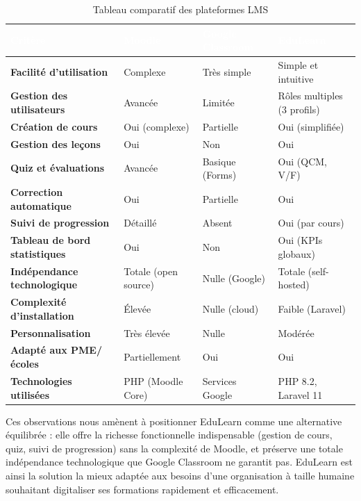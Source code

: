 \documentclass[12pt,a4paper]{report}
\begin{document}
\begin{table}[H]
\centering
\caption{Tableau comparatif des plateformes LMS}
\label{tab:comparaison_lms}
\renewcommand{\arraystretch}{1.6}
\begin{tabular}{|p{4.2cm}|>{\centering\arraybackslash}p{3cm}|>{\centering\arraybackslash}p{3cm}|>{\centering\arraybackslash}p{3cm}|}
\hline
\rowcolor[HTML]{00558C}
\textcolor{white}{\textbf{Critère}} & \textcolor{white}{\textbf{Moodle}} & \textcolor{white}{\textbf{Google Classroom}} & \textcolor{white}{\textbf{EduLearn}} \\
\hline
\textbf{Facilité d'utilisation} & Complexe & Très simple & Simple et intuitive \\
\hline
\rowcolor[HTML]{F4F9FD}
\textbf{Gestion des utilisateurs} & Avancée & Limitée & Rôles multiples (3 profils) \\
\hline
\textbf{Création de cours} & Oui (complexe) & Partielle & Oui (simplifiée) \\
\hline
\rowcolor[HTML]{F4F9FD}
\textbf{Gestion des leçons} & Oui & Non & Oui \\
\hline
\textbf{Quiz et évaluations} & Avancée & Basique (Forms) & Oui (QCM, V/F) \\
\hline
\rowcolor[HTML]{F4F9FD}
\textbf{Correction automatique} & Oui & Partielle & Oui \\
\hline
\textbf{Suivi de progression} & Détaillé & Absent & Oui (par cours) \\
\hline
\rowcolor[HTML]{F4F9FD}
\textbf{Tableau de bord statistiques} & Oui & Non & Oui (KPIs globaux) \\
\hline
\textbf{Indépendance technologique} & Totale (open source) & Nulle (Google) & Totale (self-hosted) \\
\hline
\rowcolor[HTML]{F4F9FD}
\textbf{Complexité d'installation} & Élevée & Nulle (cloud) & Faible (Laravel) \\
\hline
\textbf{Personnalisation} & Très élevée & Nulle & Modérée \\
\hline
\rowcolor[HTML]{F4F9FD}
\textbf{Adapté aux PME/écoles} & Partiellement & Oui & Oui \\
\hline
\textbf{Technologies utilisées} & PHP (Moodle Core) & Services Google & PHP 8.2, Laravel 11 \\
\hline
\end{tabular}
\end{table}

Ces observations nous amènent à positionner EduLearn comme une alternative équilibrée : elle offre la richesse fonctionnelle indispensable (gestion de cours, quiz, suivi de progression) sans la complexité de Moodle, et préserve une totale indépendance technologique que Google Classroom ne garantit pas. EduLearn est ainsi la solution la mieux adaptée aux besoins d'une organisation à taille humaine souhaitant digitaliser ses formations rapidement et efficacement.
\end{document}
